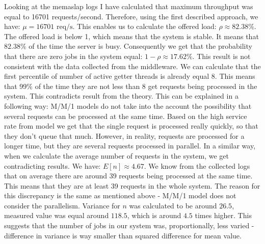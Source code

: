 \documentclass[11pt]{article}
\begin{document}
Looking at the memaslap logs I have calculated that maximum throughput was equal to 16701 requests/second. Therefore, using the first described approach, we have:
$\mu = 16701\textrm{ req/s}$.
This enables us to calculate the offered load:
$\rho \approx 82.38\%$.
The offered load is below 1, which means that the system is stable. It means that $82.38\%$ of the time the server is busy.
Consequently we get that the  probability that there are zero jobs in the system equal: $1 - \rho \approx 17.62\%$. 
This result is not consistent with the data collected from the middleware. We can calculate that the first percentile of number of active getter threads is already equal 8. This means that 99\% of the time they are not less than 8 get requests being processed in the system. This contradicts result from the theory. This can be explained in a following way: M/M/1 models do not take into the account the possibility that several requests can be processed at the same time. Based on the high service rate from model we get that the single request is processed really quickly, so that they don't queue that much. However, in reality, requests are processed for a longer time, but they are several requests processed in parallel. In a similar way, when we calculate the average number of requests in the system, we get contradicting results. We have:
$E[n] 
\approx 4.67$.
We know from the collected logs that on average there are around 39 requests being processed at the same time. This means that they are at least 39 requests in the whole system. The reason for this discrepancy is the same as mentioned above - M/M/1 model does not consider the parallelism. Variance for $n$ was calculated to be around $26.5$, measured value was equal around $118.5$, which is around $4.5$ times higher. This suggests that the number of jobs in our system was, proportionally, less varied - difference in variance is way smaller than squared difference for mean value.
\end{document}
